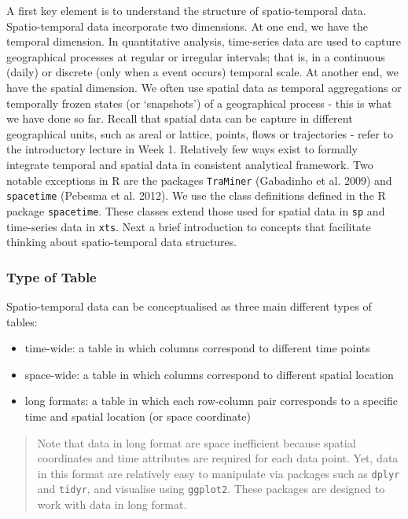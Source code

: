 \documentclass[
  letterpaper,
  DIV=11,
  numbers=noendperiod,
  oneside]{scrreprt}
\begin{document}
A first key element is to understand the structure of spatio-temporal
data. Spatio-temporal data incorporate two dimensions. At one end, we
have the temporal dimension. In quantitative analysis, time-series data
are used to capture geographical processes at regular or irregular
intervals; that is, in a continuous (daily) or discrete (only when a
event occurs) temporal scale. At another end, we have the spatial
dimension. We often use spatial data as temporal aggregations or
temporally frozen states (or `snapshots') of a geographical process -
this is what we have done so far. Recall that spatial data can be
capture in different geographical units, such as areal or lattice,
points, flows or trajectories - refer to the introductory lecture in
Week 1. Relatively few ways exist to formally integrate temporal and
spatial data in consistent analytical framework. Two notable exceptions
in R are the packages \texttt{TraMiner} (Gabadinho et al. 2009) and
\texttt{spacetime} (Pebesma et al. 2012). We use the class definitions
defined in the R package \texttt{spacetime}. These classes extend those
used for spatial data in \texttt{sp} and time-series data in
\texttt{xts}. Next a brief introduction to concepts that facilitate
thinking about spatio-temporal data structures.

\subsubsection{Type of Table}\label{type-of-table}

Spatio-temporal data can be conceptualised as three main different types
of tables:

\begin{itemize}
\item
  time-wide: a table in which columns correspond to different time
  points
\item
  space-wide: a table in which columns correspond to different spatial
  location
\item
  long formats: a table in which each row-column pair corresponds to a
  specific time and spatial location (or space coordinate)
\end{itemize}

\begin{quote}
Note that data in long format are space inefficient because spatial
coordinates and time attributes are required for each data point. Yet,
data in this format are relatively easy to manipulate via packages such
as \texttt{dplyr} and \texttt{tidyr}, and visualise using
\texttt{ggplot2}. These packages are designed to work with data in long
format.
\end{quote}
\end{document}
